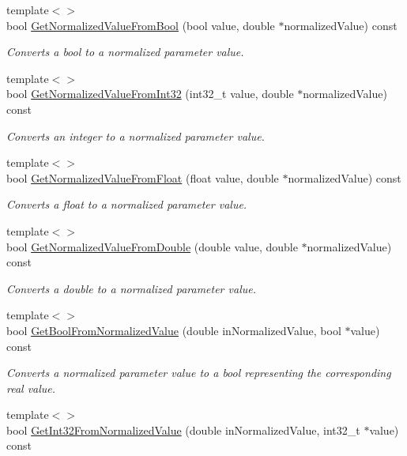 \begin{DoxyCompactItemize}
{\footnotesize template$<$$>$ }\\bool \hyperlink{a00033_af937d0b1ddc00325bb539bcb6ab0aa66}{Get\+Normalized\+Value\+From\+Bool} (bool value, double $\ast$normalized\+Value) const
\begin{DoxyCompactList}\small\item\em Converts a bool to a normalized parameter value. \end{DoxyCompactList}\item 
{\footnotesize template$<$$>$ }\\bool \hyperlink{a00033_ae4f0bf9f8792da1e488b81c14587136c}{Get\+Normalized\+Value\+From\+Int32} (int32\+\_\+t value, double $\ast$normalized\+Value) const
\begin{DoxyCompactList}\small\item\em Converts an integer to a normalized parameter value. \end{DoxyCompactList}\item 
{\footnotesize template$<$$>$ }\\bool \hyperlink{a00033_a60c853975230efbbb70dcfaae80fdc6e}{Get\+Normalized\+Value\+From\+Float} (float value, double $\ast$normalized\+Value) const
\begin{DoxyCompactList}\small\item\em Converts a float to a normalized parameter value. \end{DoxyCompactList}\item 
{\footnotesize template$<$$>$ }\\bool \hyperlink{a00033_a85d148dd6e134226ac72f17da0abee0b}{Get\+Normalized\+Value\+From\+Double} (double value, double $\ast$normalized\+Value) const
\begin{DoxyCompactList}\small\item\em Converts a double to a normalized parameter value. \end{DoxyCompactList}\item 
{\footnotesize template$<$$>$ }\\bool \hyperlink{a00033_a69f7107140ac4721a9e4169d430e247a}{Get\+Bool\+From\+Normalized\+Value} (double in\+Normalized\+Value, bool $\ast$value) const
\begin{DoxyCompactList}\small\item\em Converts a normalized parameter value to a bool representing the corresponding real value. \end{DoxyCompactList}\item 
{\footnotesize template$<$$>$ }\\bool \hyperlink{a00033_ad38f15504ff550f19fb9a18a56960cfe}{Get\+Int32\+From\+Normalized\+Value} (double in\+Normalized\+Value, int32\+\_\+t $\ast$value) const

\end{DoxyCompactItemize}
